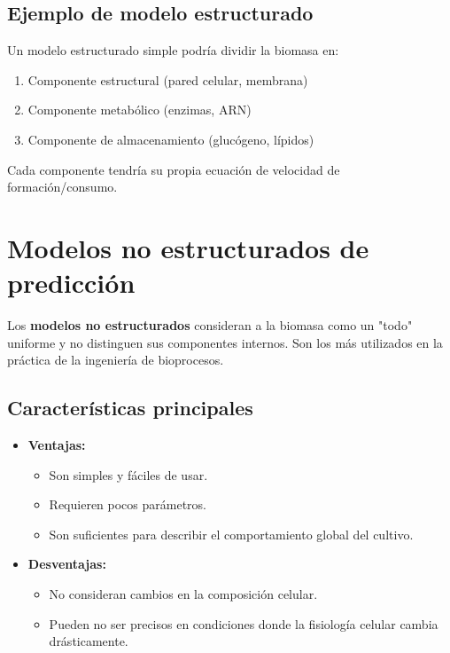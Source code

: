 \subsection{Ejemplo de modelo estructurado}

Un modelo estructurado simple podría dividir la biomasa en:

\begin{enumerate}
    \item Componente estructural (pared celular, membrana)
    \item Componente metabólico (enzimas, ARN)
    \item Componente de almacenamiento (glucógeno, lípidos)
\end{enumerate}

Cada componente tendría su propia ecuación de velocidad de formación/consumo.


\section{Modelos no estructurados de predicción}

Los \textbf{modelos no estructurados} consideran a la biomasa como un "todo" uniforme y no distinguen sus componentes internos. Son los más utilizados en la práctica de la ingeniería de bioprocesos.

\subsection{Características principales}
\begin{itemize}
    \item \textbf{Ventajas:}
        \begin{itemize}
            \item Son simples y fáciles de usar.
            \item Requieren pocos parámetros.
            \item Son suficientes para describir el comportamiento global del cultivo.
        \end{itemize}
    \item \textbf{Desventajas:}
        \begin{itemize}
            \item No consideran cambios en la composición celular.
            \item Pueden no ser precisos en condiciones donde la fisiología celular cambia drásticamente.
        \end{itemize}
\end{itemize}

